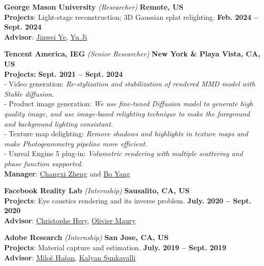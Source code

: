 \documentclass[margin,line]{resume}
\begin{document}
\begin{resume}
	\textbf{George Mason University} \textsl{(Researcher)} \hfill \textbf{Remote, US} \\
	\textbf{Projects}: Light-stage reconstruction; 3D Gaussian splat relighting. \hfill \textbf{Feb. 2024 -- Sept. 2024} \hfill \\
	\textbf{Advisor}: \href{https://cs.gmu.edu/~jinweiye/}{Jinwei Ye}, \href{https://yeauxji.github.io/}{Yu Ji}
	
	\vspace{0.0mm}
	
	\textbf{Tencent America, IEG} \textsl{(Senior Researcher)} \hfill \textbf{New York \& Playa Vista, CA, US} \\
	\textbf{Projects:} \hfill \textbf{Sept. 2021 -- Sept. 2024} \hfill \\
	- Video generation: \textsl{Re-stylization and stabilization of rendered MMD model with Stable diffusion.} \\
	- Product image generation: \textsl{We use fine-tuned Diffusion model to generate high quality image, and use image-based relighting technique to make the foreground and background lighting consistant.} \\
	- Texture map delighting: \textsl{Remove shadows and highlights in texture maps and make Photogrammetry pipeline more efficient.} \\
	- Unreal Engine 5 plug-in: \textsl{Volumetric rendering with multiple scattering and phase function supported.} \\
	\textbf{Manager}: \href{https://www.cs.columbia.edu/~cxz/}{Changxi Zheng} and  \href{https://sites.google.com/site/boyanghome/home}{Bo Yang}
	
	\vspace{0.0mm}

	\textbf{Facebook Reality Lab} \textsl{(Internship)} \hfill \textbf{Sausalito, CA, US} \\
	\textbf{Projects}: Eye caustics rendering and its inverse problem. \hfill \textbf{July. 2020 -- Sept. 2020}\\
	\textbf{Advisor}: \href{https://graphics.pixar.com/library/indexAuthorChristophe_Hery.html}{Christophe Hery}, \href{https://www.imdb.com/name/nm1436524/}{Olivier Maury}       

    \vspace{0.0mm}

	\textbf{Adobe Research} \textsl{(Internship)} \hfill \textbf{San Jose, CA, US} \\
	\textbf{Projects}: Material capture and estimation. \hfill \textbf{July. 2019 -- Sept. 2019}\\
	\textbf{Advisor}: \href{http://miloshasan.net/}{Milo\v{s} Ha\v{s}an}, \href{https://research.adobe.com/person/kalyan-sunkavalli/}{Kalyan Sunkavalli}       


\end{resume}
\end{document}

